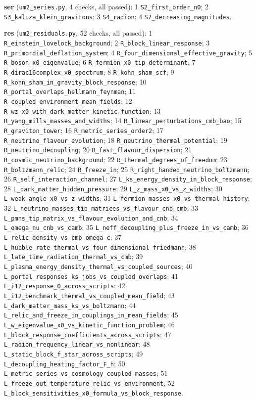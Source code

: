\documentclass[
  10pt,
]{article}
\begin{document}
\textbf{ser} (\texttt{um2\_series.py}, 4 checks, all passed): 1
\texttt{S2\_first\_order\_n0}; 2 \texttt{S3\_kaluza\_klein\_gravitons};
3 \texttt{S4\_radion}; 4 \texttt{S7\_decreasing\_magnitudes}.

\textbf{res} (\texttt{um2\_residuals.py}, 52 checks, all passed): 1
\texttt{R\_einstein\_lovelock\_background}; 2
\texttt{R\_block\_linear\_response}; 3
\texttt{R\_primordial\_deflation\_system}; 4
\texttt{R\_four\_dimensional\_effective\_gravity}; 5
\texttt{R\_boson\_x0\_eigenvalue}; 6
\texttt{R\_fermion\_x0\_tip\_determinant}; 7
\texttt{R\_dirac16complex\_x0\_spectrum}; 8 \texttt{R\_kohn\_sham\_scf};
9 \texttt{R\_kohn\_sham\_in\_gravity\_block\_response}; 10
\texttt{R\_portal\_overlaps\_hellmann\_feynman}; 11
\texttt{R\_coupled\_environment\_mean\_fields}; 12
\texttt{R\_wz\_x0\_with\_dark\_matter\_kinetic\_function}; 13
\texttt{R\_yang\_mills\_masses\_and\_widths}; 14
\texttt{R\_linear\_perturbations\_cmb\_bao}; 15
\texttt{R\_graviton\_tower}; 16 \texttt{R\_metric\_series\_order2}; 17
\texttt{R\_neutrino\_flavour\_evolution}; 18
\texttt{R\_neutrino\_thermal\_potential}; 19
\texttt{R\_neutrino\_decoupling}; 20
\texttt{R\_fast\_flavour\_dispersion}; 21
\texttt{R\_cosmic\_neutrino\_background}; 22
\texttt{R\_thermal\_degrees\_of\_freedom}; 23
\texttt{R\_boltzmann\_relic}; 24 \texttt{R\_freeze\_in}; 25
\texttt{R\_right\_handed\_neutrino\_boltzmann}; 26
\texttt{R\_self\_interaction\_channel}; 27
\texttt{L\_ks\_energy\_density\_in\_block\_response}; 28
\texttt{L\_dark\_matter\_hidden\_pressure}; 29
\texttt{L\_z\_mass\_x0\_vs\_z\_widths}; 30
\texttt{L\_weak\_angle\_x0\_vs\_z\_widths}; 31
\texttt{L\_fermion\_masses\_x0\_vs\_thermal\_history}; 32
\texttt{L\_neutrino\_masses\_tip\_matrices\_vs\_flavour\_cnb\_cmb}; 33
\texttt{L\_pmns\_tip\_matrix\_vs\_flavour\_evolution\_and\_cnb}; 34
\texttt{L\_omega\_nu\_cnb\_vs\_camb}; 35
\texttt{L\_neff\_decoupling\_plus\_freeze\_in\_vs\_camb}; 36
\texttt{L\_relic\_density\_vs\_cmb\_omega\_c}; 37
\texttt{L\_hubble\_rate\_thermal\_vs\_four\_dimensional\_friedmann}; 38
\texttt{L\_late\_time\_radiation\_thermal\_vs\_cmb}; 39
\texttt{L\_plasma\_energy\_density\_thermal\_vs\_coupled\_sources}; 40
\texttt{L\_portal\_responses\_ks\_jobs\_vs\_coupled\_overlaps}; 41
\texttt{L\_i12\_response\_O\_across\_scripts}; 42
\texttt{L\_i12\_benchmark\_thermal\_vs\_coupled\_mean\_field}; 43
\texttt{L\_dark\_matter\_mass\_ks\_vs\_boltzmann}; 44
\texttt{L\_relic\_and\_freeze\_in\_couplings\_in\_mean\_fields}; 45
\texttt{L\_w\_eigenvalue\_x0\_vs\_kinetic\_function\_problem}; 46
\texttt{L\_block\_response\_coefficients\_across\_scripts}; 47
\texttt{L\_radion\_frequency\_linear\_vs\_nonlinear}; 48
\texttt{L\_static\_block\_f\_star\_across\_scripts}; 49
\texttt{L\_decoupling\_heating\_factor\_F\_h}; 50
\texttt{L\_metric\_series\_vs\_cosmology\_coupled\_masses}; 51
\texttt{L\_freeze\_out\_temperature\_relic\_vs\_environment}; 52
\texttt{L\_block\_sensitivities\_x0\_formula\_vs\_block\_response}.
\end{document}
